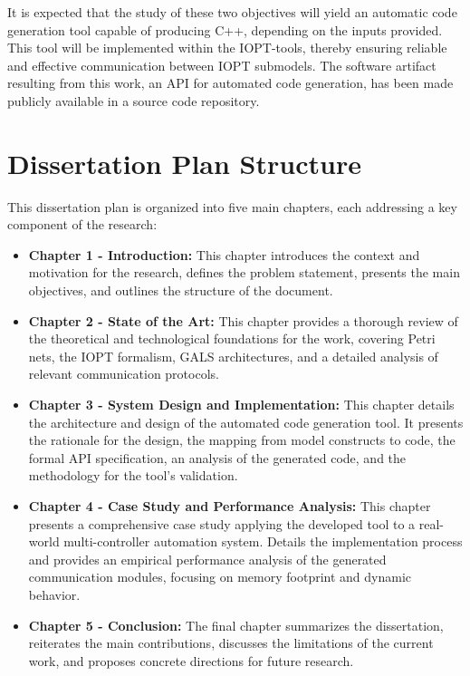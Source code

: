 It is expected that the study of these two objectives will yield an automatic code generation tool capable of producing C++, depending on the inputs provided. This tool will be implemented within the IOPT-tools, thereby ensuring reliable and effective communication between IOPT submodels.
The software artifact resulting from this work, an API for automated code generation, has been made publicly available in a source code repository.




\section{Dissertation Plan Structure}
\label{sec:dissertation_structure}


This dissertation plan is organized into five main chapters, each addressing a key component of the research:

\begin{itemize}
    \item \textbf{Chapter 1 - Introduction:} This chapter introduces the context and motivation for the research, defines the problem statement, presents the main objectives, and outlines the structure of the document.

    \item \textbf{Chapter 2 - State of the Art:} This chapter provides a thorough review of the theoretical and technological foundations for the work, covering Petri nets, the IOPT formalism, GALS architectures, and a detailed analysis of relevant communication protocols.

    \item \textbf{Chapter 3 - System Design and Implementation:} This chapter details the architecture and design of the automated code generation tool. It presents the rationale for the design, the mapping from model constructs to code, the formal API specification, an analysis of the generated code, and the methodology for the tool's validation.

    \item \textbf{Chapter 4 - Case Study and Performance Analysis:} This chapter presents a comprehensive case study applying the developed tool to a real-world multi-controller automation system. Details the implementation process and provides an empirical performance analysis of the generated communication modules, focusing on memory footprint and dynamic behavior.

    \item \textbf{Chapter 5 - Conclusion:} The final chapter summarizes the dissertation, reiterates the main contributions, discusses the limitations of the current work, and proposes concrete directions for future research.
\end{itemize}


